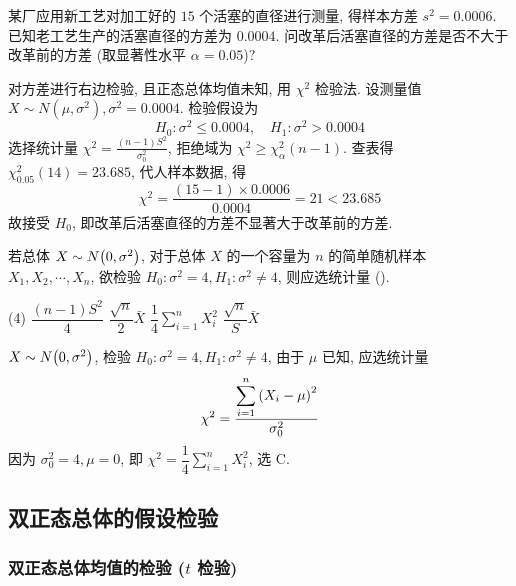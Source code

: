 \begin{example}
    某厂应用新工艺对加工好的 $15 $ 个活塞的直径进行测量, 得样本方差 $ s^{2}=  0.0006$.
    已知老工艺生产的活塞直径的方差为 $0.0004$. 问改革后活塞直径的方差是否不大于改革前的方差 (取显著性水平 $ \alpha=0.05$)?
\end{example}
\begin{solution}
    对方差进行右边检验, 且正态总体均值未知, 用 $ \chi^{2} $ 检验法.
    设测量值 $ X \sim N\left(\mu, \sigma^{2}\right), \sigma^{2}=0.0004 $.
    检验假设为
    $$H_{0}: \sigma^{2} \leqslant 0.0004, \quad H_{1}: \sigma^{2}>0.0004 $$
    选择统计量 $\displaystyle \chi^{2}=\frac{(n-1) S^{2}}{\sigma_{0}^{2}} $, 拒绝域为 $ \chi^{2} \geqslant \chi_{\alpha}^{2}(n-1) $.
    查表得 $ \chi_{0.05}^{2}(14)=23.685$, 代人样本数据, 得 $$\displaystyle \chi^{2}=\frac{(15-1) \times 0.0006}{0.0004}=21<23.685 $$
    故接受 $ H_{0} $, 即改革后活塞直径的方差不显著大于改革前的方差.
\end{solution}

\begin{example}
    若总体 $X\sim N\qty(0,\sigma^2)$, 对于总体 $X$ 的一个容量为 $n$ 的简单随机样本 $X_1, X_2, \cdots ,X_n$, 欲检验 $H_0:\sigma^2=4,H_1:\sigma^2\neq 4$, 则应选统计量 (\quad).
    \begin{tasks}(4)
        \task $\dfrac{(n-1)S^2}{4}$
        \task $\dfrac{\sqrt{n}}{2}\bar{X}$
        \task $\dfrac{1}{4}\displaystyle \sum_{i=1}^{n} X_i^2$
        \task $\dfrac{\sqrt{n}}{S}\bar{X}$
    \end{tasks}
\end{example}
\begin{solution}
    $X\sim N\qty(0,\sigma^2)$, 检验 $H_0:\sigma^2=4,H_1:\sigma^2\neq 4$, 由于 $\mu$ 已知, 应选统计量
    $$
        \chi^2=\dfrac{\displaystyle \sum_{i=1}^{n} \qty(X_i-\mu)^2}{\sigma_0^2}
    $$
    因为 $\sigma_0^2=4, \mu=0$, 即 $\chi^2=\displaystyle \dfrac{1}{4}\sum_{i=1}^{n} X_i^2$, 选 C.
\end{solution}

\subsection{双正态总体的假设检验}


\subsubsection{双正态总体均值的检验 (\texorpdfstring{$t$}. 检验)}

